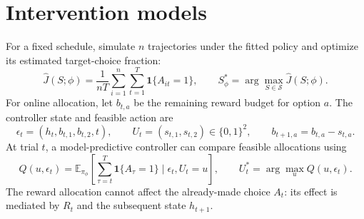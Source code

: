 \documentclass[11pt]{article}
\begin{document}
\section{Intervention models}
For a fixed schedule, simulate $n$ trajectories under the fitted policy and optimize its estimated target-choice fraction:
\begin{equation}
\widehat J(S;\phi)=\frac{1}{nT}\sum_{i=1}^{n}\sum_{t=1}^{T}\mathbf1\{A_{it}=1\},\qquad S^*_{\phi}=\arg\max_{S\in\mathcal S}\widehat J(S;\phi).\label{eq:fixed}
\end{equation}
For online allocation, let $b_{t,a}$ be the remaining reward budget for option $a$. The controller state and feasible action are
\begin{equation}
\epsilon_t=(h_t,b_{t,1},b_{t,2},t),\qquad U_t=(s_{t,1},s_{t,2})\in\{0,1\}^{2},\qquad b_{t+1,a}=b_{t,a}-s_{t,a}.\label{eq:controller}
\end{equation}
At trial $t$, a model-predictive controller can compare feasible allocations using
\begin{equation}
Q(u,\epsilon_t)=\mathbb E_{\pi_\phi}\!\left[\sum_{\tau=t}^{T}\mathbf1\{A_\tau=1\}\mid\epsilon_t,U_t=u\right],\qquad U_t^*=\arg\max_{u}Q(u,\epsilon_t).\label{eq:q}
\end{equation}
The reward allocation cannot affect the already-made choice $A_t$: its effect is mediated by $R_t$ and the subsequent state $h_{t+1}$.

\end{document}
